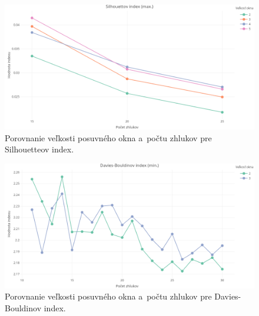 \documentclass[a4paper,twoside,slovak,12pt,appendix]{article}
\begin{document}
\begin{figure}[htbp]
  \centering
  \includegraphics[width=\textwidth]{cvi/dtw_basic_workdays_sparse/201902271850-Sil-dtw_basic_workdays_sparse.png}
  \caption{Porovnanie veľkosti posuvného okna a~počtu zhlukov pre Silhouetteov index.}
	\label{fig:cvi-sparse-sil}
\end{figure}
\begin{figure}[htbp]
  \centering
  \includegraphics[width=\textwidth]{cvi/dtw_basic_workdays_dense/201902271851-DB-dtw_basic_workdays_dense.png}
  \caption{Porovnanie veľkosti posuvného okna a~počtu zhlukov pre Davies-Bouldinov index.}
	\label{fig:cvi-dense-db}
\end{figure}
\end{document}

